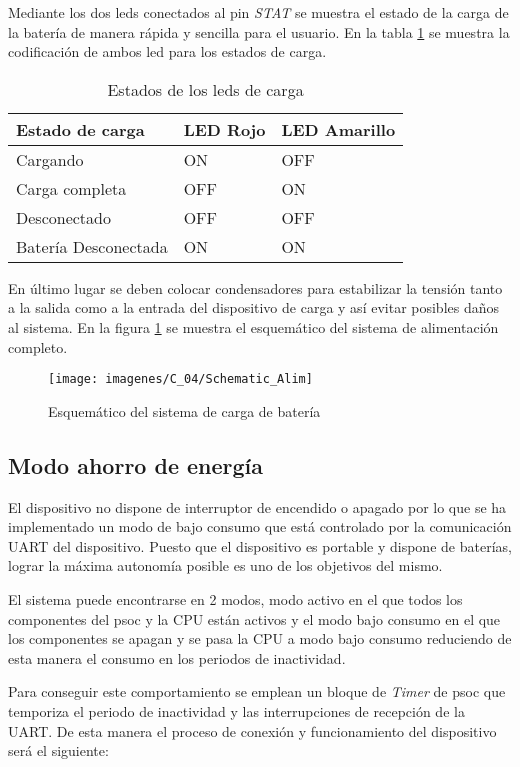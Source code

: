 Mediante los dos leds conectados al pin \textit{STAT} se muestra el estado de la carga de la batería de manera rápida y sencilla para el usuario. En la tabla \ref{tab:bat_leds} se muestra la codificación de ambos \acrshort{led} para los estados de carga. 

\begin{table}[!ht]
  \centering
  
  \begin{tabular}{|l|l|l|}
    \hline
    \textbf{Estado de carga} & \textbf{LED Rojo}& \textbf{LED Amarillo} \tabularnewline
    \hline
     Cargando & ON & OFF \tabularnewline
    \hline
     Carga completa & OFF & ON  \tabularnewline
    \hline
     Desconectado& OFF & OFF \tabularnewline
    \hline
     Batería Desconectada& ON &ON \tabularnewline
    \hline
    \end{tabular}%
    \caption{Estados de los \acrshort{led}s de carga}
  \label{tab:bat_leds}%
\end{table}%

En último lugar se deben colocar condensadores para estabilizar la tensión tanto a la salida como a la entrada del dispositivo de carga y así evitar posibles daños al sistema. En la figura \ref{fig:bat_charger} se muestra el esquemático del sistema de alimentación completo.

 \begin{figure}[!ht]
	\center
	\texttt{[image: imagenes/C\_04/Schematic\_Alim]}
	\caption{Esquemático del sistema de carga de batería}
	\label{fig:bat_charger}
\end{figure}

\subsection{Modo ahorro de energía}
El dispositivo no dispone de interruptor de encendido o apagado por lo que se ha implementado un modo de bajo consumo que está controlado por la comunicación UART del dispositivo. Puesto que el dispositivo es portable y dispone de baterías, lograr la máxima autonomía posible es uno de los objetivos del mismo. 

El sistema puede encontrarse en 2 modos, modo activo en el que todos los componentes del \acrshort{psoc} y la CPU están activos y el modo bajo consumo en el que los componentes se apagan y se pasa la CPU a modo bajo consumo reduciendo de esta manera el consumo en los periodos de inactividad.

Para conseguir este comportamiento se emplean un bloque de \textit{Timer} de \acrshort{psoc} que temporiza el periodo de inactividad y las interrupciones de recepción de la UART. De esta manera el proceso de conexión y funcionamiento del dispositivo será el siguiente:

